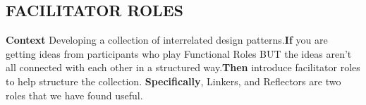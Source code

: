 \subsection*{FACILITATOR ROLES {\hfill \cognitive}}
\textbf{Context} Developing a collection of interrelated design
patterns.\newline \textbf{If} you are getting ideas from participants
who play {\sc Functional Roles} BUT the ideas aren’t all connected
with each other in a structured way.\newline \textbf{Then} introduce
facilitator roles to help structure the collection.\newline
\textbf{Specifically}, {\sc Linker}s, and {\sc Reflector}s are two
roles that we have found useful.
